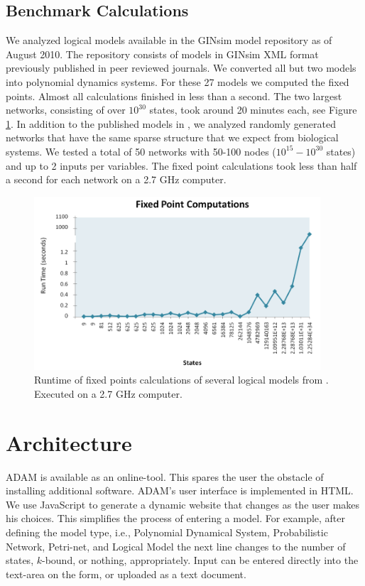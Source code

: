 \documentclass[11pt]{amsart}
\begin{document}
\subsection{Benchmark Calculations}
We analyzed logical models
available in the GINsim model repository \cite{GINsimRepo} as of August 2010. The
repository consists of models in GINsim XML format previously published in
peer reviewed journals. We converted all but two models into polynomial
dynamics systems. For these 27 models we computed the fixed points. Almost all
calculations finished in less than a second. The two largest networks,
consisting of over $10^{30}$ states, took around 20 minutes each, see
Figure \ref{fig:chart}.
In addition to the published models in \cite{GINsimRepo}, we analyzed
randomly generated networks
that have the same sparse structure that we
expect from biological systems. We tested a total of 50 networks with
50-100 nodes ($10^{15} - 10^{30}$ states) and up to 2 inputs per variables. The
fixed point calculations took less than half a second for each network on
a 2.7 GHz computer.
\begin{figure}[htb]
\centering
\includegraphics[width=0.95\textwidth]{GINSimChart.png}
\caption{Runtime of fixed points calculations of several logical models from
\cite{GINsimRepo}. Executed on a 2.7 GHz computer.}
\label{fig:chart}
\end{figure}
\section{Architecture}
ADAM is available as an online-tool. This spares the user the obstacle of installing additional software. ADAM's user interface is implemented in HTML. We use JavaScript to generate a dynamic website that changes as the user makes his choices. This simplifies the process of entering a model. For example, after defining the model type, i.e., Polynomial Dynamical System, Probabilistic Network, Petri-net, and Logical Model the next line changes to the number of states, $k$-bound, or nothing, appropriately. Input can be entered directly into the text-area on the form, or uploaded as a text document.
 
\end{document}
